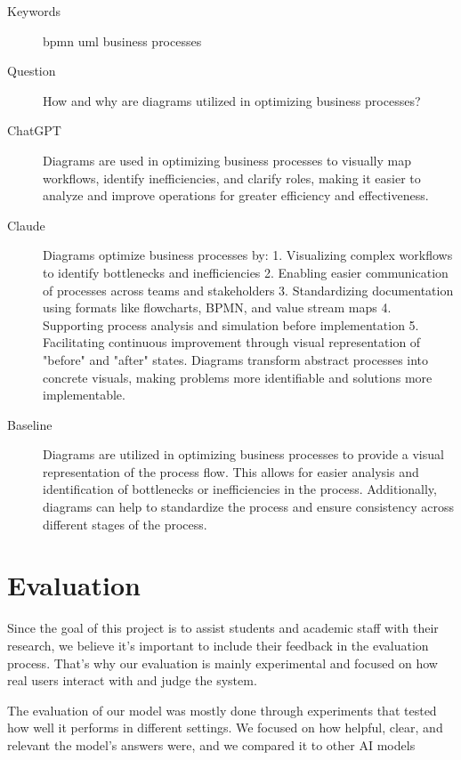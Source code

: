 \documentclass[fleqn,moreauthors,10pt]{ds_report}
\begin{document}
\begin{description}
	\item[Keywords] bpmn uml business processes
	\item[Question] How and why are diagrams utilized in optimizing business processes?
\end{description}

\begin{description}
	\item[ChatGPT] Diagrams are used in optimizing business processes to visually map workflows, identify inefficiencies, and clarify roles, making it easier to analyze and improve operations for greater efficiency and effectiveness.
	\item[Claude] Diagrams optimize business processes by: 1. Visualizing complex workflows to identify bottlenecks and inefficiencies 2. Enabling easier communication of processes across teams and stakeholders 3. Standardizing documentation using formats like flowcharts, BPMN, and value stream maps 4. Supporting process analysis and simulation before implementation 5. Facilitating continuous improvement through visual representation of "before" and "after" states. Diagrams transform abstract processes into concrete visuals, making problems more identifiable and solutions more implementable.
	\item[Baseline] Diagrams are utilized in optimizing business processes to provide a visual representation of the process flow. This allows for easier analysis and identification of bottlenecks or inefficiencies in the process. Additionally, diagrams can help to standardize the process and ensure consistency across different stages of the process.
\end{description}

\section*{Evaluation}


Since the goal of this project is to assist students and academic staff with their research, we believe it’s important to include their feedback in the evaluation process. That’s why our evaluation is mainly experimental and focused on how real users interact with and judge the system.

The evaluation of our model was mostly done through experiments that tested how well it performs in different settings. We focused on how helpful, clear, and relevant the model’s answers were, and we compared it to other AI models
\end{document}
